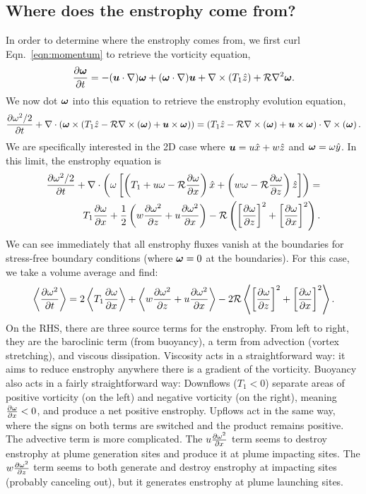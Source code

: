 \subsection{Where does the enstrophy come from?}
\label{sec:enstrophy_generation}
In order to determine where the enstrophy comes from, we first curl Eqn.~\ref{eqn:momentum} to retrieve the vorticity equation,
\begin{equation}
\frac{\partial \bm{\omega}}{\partial t} = -(\bm{u} \cdot \nabla)\bm{\omega} + (\bm{\omega} \cdot \nabla)\bm{u} + \nabla \times \left(T_1\hat{z}\right) + \mathcal{R} \nabla^2 \bm{\omega}.
\end{equation}
We now dot $\bm{\omega}$ into this equation to retrieve the enstrophy evolution equation,
\begin{equation}
\frac{\partial \omega^2/2}{\partial t} + \nabla\cdot\left( \bm{\omega} \times \left(T_1\hat{z} - \mathcal{R}\nabla \times \left(\bm{\omega}\right) + \bm{u} \times \bm{\omega}\right)\right) = \left(T_1\hat{z} - \mathcal{R}\nabla \times \left(\bm{\omega}\right) + \bm{u} \times \bm{\omega}\right) \cdot \nabla \times \left(\bm{\omega}\right).
\end{equation}
We are specifically interested in the 2D case where $\bm{u} = u\hat{x} + w\hat{z}$ and $\bm{\omega} = \omega\hat{y}$.
In this limit, the enstrophy equation is
\begin{equation}
\begin{split}
\frac{\partial \omega^2/2}{\partial t} + \nabla\cdot\left( \omega\left[\left(T_1 + u\omega - \mathcal{R}\frac{\partial \omega}{\partial x}\right)\hat{x} + \left(w\omega - \mathcal{R}\frac{\partial \omega}{\partial z}\right)\hat{z}\right]\right) 
=\\ T_1\frac{\partial \omega}{\partial x} + \frac{1}{2}\left(w\frac{\partial \omega^2}{\partial z} + u\frac{\partial \omega^2}{\partial x}\right) - \mathcal{R} \left(\left[\frac{\partial \omega}{\partial z}\right]^2 + \left[\frac{\partial \omega}{\partial x}\right]^2\right).
\end{split}
\end{equation}
We can see immediately that all enstrophy fluxes vanish at the boundaries for stress-free boundary conditions (where $\bm{\omega} = 0$ at the boundaries).
For this case, we take a volume average and find:
\begin{equation}
\left\langle \frac{\partial \omega^2}{\partial t} \right\rangle = 2\left\langle T_1\frac{\partial \omega}{\partial x} \right\rangle + \left\langle w\frac{\partial \omega^2}{\partial z} + u\frac{\partial \omega^2}{\partial x} \right\rangle - 2\mathcal{R} \left\langle \left[\frac{\partial \omega}{\partial z}\right]^2 + \left[\frac{\partial \omega}{\partial x}\right]^2 \right\rangle.
\end{equation}
On the RHS, there are three source terms for the enstrophy.
From left to right, they are the baroclinic term (from buoyancy), a term from advection (vortex stretching), and viscous dissipation.
Viscosity acts in a straightforward way: it aims to reduce enstrophy anywhere there is a gradient of the vorticity.
Buoyancy also acts in a fairly straightforward way: Downflows ($T_1 < 0$) separate areas of positive vorticity (on the left) and negative vorticity (on the right), meaning $\frac{\partial \omega}{\partial x} < 0$, and produce a net positive enstrophy.
Upflows act in the same way, where the signs on both terms are switched and the product remains positive.
The advective term is more complicated.
The $u \frac{\partial \omega^2}{\partial x}$ term seems to destroy enstrophy at plume generation sites and produce it at plume impacting sites.
The $w \frac{\partial \omega^2}{\partial z}$ term seems to both generate and destroy enstrophy at  impacting sites (probably canceling out), but it generates enstrophy at plume launching sites.

